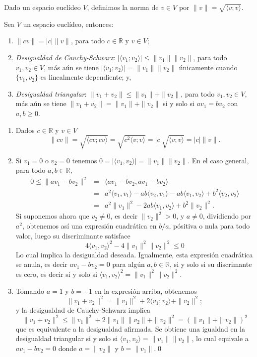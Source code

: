 \begin{defn}
Dado un espacio eucl\'ideo $V$, definimos la norma de $v\in V$ por $\|v\|=\sqrt{\langle v;v\rangle}$.
\end{defn}

\begin{pro}
Sea $V$ un espacio eucl\'ideo, entonces:
\begin{enumerate}
\item $\|cv\|=|c|\|v\|$, para todo $c\in\mathbb{R}$ y $v\in V$;
\item \emph{Desigualdad de Cauchy-Schwarz}: $|\langle v_1;v_2\rangle|\le\|v_1\|\|v_2\|$, para todo $v_1,v_2\in V$, m\'as a\'un se tiene $|\langle v_1;v_2\rangle|=\|v_1\|\|v_2\|$ \'unicamente cuando $\{v_1,v_2\}$ es linealmente dependiente; y,
\item \emph{Desigualdad triangular}: $\|v_1+v_2\|\le \|v_1\|+\|v_2\|$, para todo $v_1,v_2\in V$, m\'as a\'un se tiene $\|v_1+v_2\|= \|v_1\|+\|v_2\|$ si y solo si $av_1=bv_2$ con $a,b\ge 0$.
\end{enumerate}
\end{pro}

\dem\begin{enumerate}
\item Dados $c\in\mathbb{R}$ y $v\in V$
\[
\|cv\|=\sqrt{\langle cv;cv\rangle}=\sqrt{c^2\langle v;v\rangle}=|c|\sqrt{\langle v;v\rangle}=|c|\|v\|.
\]
\item Si $v_1=0$ o $v_2=0$ tenemos $0=|\langle v_1,v_2\rangle|=\|v_1\|\|v_2\|$. En el caso general, para todo $a,b\in\mathbb{R}$,
\begin{eqnarray*}
0 \le \|av_1-bv_2\|^2 & = & \langle av_1-bv_2 , av_1-bv_2\rangle\\
   & = & a^2\langle v_1, v_1\rangle-ab\langle v_2, v_1\rangle-ab\langle v_1, v_2\rangle+b^2\langle v_2, v_2\rangle\\
   & = & a^2\|v_1\|^2-2ab\langle v_1, v_2\rangle+b^2\|v_2\|^2.
\end{eqnarray*}
Si suponemos ahora que $v_2\ne 0$, es decir $\|v_2\|^2>0$, y $a\ne 0$, dividiendo por $a^2$, obtenemos as\'i una expresi\'on cuadr\'atica en $b/a$, p\'ositiva o nula para todo valor, luego su discriminante satisface
\[
4\langle v_1,v_2\rangle^2-4\|v_1\|^2\|v_2\|^2\le 0
\]
Lo cual implica la desigualdad deseada. Igualmente, esta expresi\'on cuadr\'atica se anula, es decir $av_1-bv_2=0$ para alg\'un $a,b\in\mathbb{R}$, si y solo si su discrimante es cero, es decir si y solo si $\langle v_1,v_2\rangle^2=\|v_1\|^2\|v_2\|^2$.
\item Tomando $a=1$ y $b=-1$ en la expresi\'on arriba, obtenemos
\[
\|v_1+v_2\|^2=\|v_1\|^2+2\langle v_1; v_2\rangle+\|v_2\|^2;
\]
y la desigualdad de Cauchy-Schwarz implica
\[
\|v_1+v_2\|^2\le\|v_1\|^2+2\|v_1\|\|v_2\|+\|v_2\|^2=(\|v_1\|+\|v_2\|)^2
\]
que es equivalente a la desigualdad afirmada. Se obtiene una igualdad en la desigualdad triangular si y solo si $\langle v_1, v_2\rangle=\|v_1\|\|v_2\|$, lo cual equivale a $av_1-bv_2=0$ donde $a=\|v_2\|$ y $b=\|v_1\|$.\qed
\end{enumerate}

